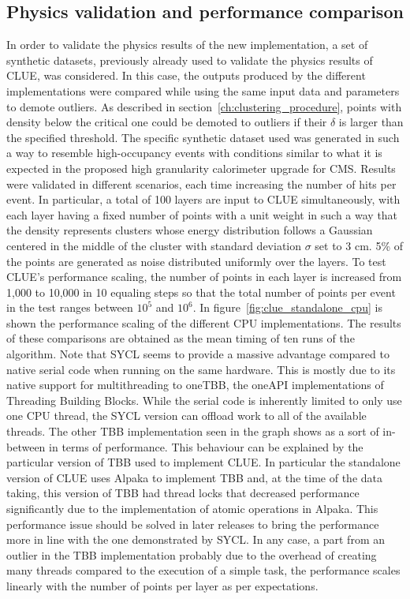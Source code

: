 \subsection{Physics validation and performance comparison}
In order to validate the physics results of the new implementation, a set of synthetic datasets, previously already used to validate the physics results of CLUE, was considered. In this case, the outputs produced by the different implementations were compared while using the same input data and parameters to demote outliers. As described in section~\ref{ch:clustering_procedure}, points with density below the critical one could be demoted to outliers if their $\delta$ is larger than the specified threshold. The specific synthetic dataset used was generated in such a way to resemble high-occupancy events with conditions similar to what it is expected in the proposed high granularity calorimeter upgrade for CMS. Results were validated in different scenarios, each time increasing the number of hits per event. In particular, a total of 100 layers are input to CLUE simultaneously, with each layer having a fixed number of points with a unit weight in such a way that the density represents clusters whose energy distribution follows a Gaussian centered in the middle of the cluster with standard deviation $\sigma$ set to 3 cm. 5\% of the points are generated as noise distributed uniformly over the layers. To test CLUE's performance scaling, the number of points in each layer is increased from 1,000 to 10,000 in 10 equaling steps so that the total number of points per event in the test ranges between $10^5$ and $10^6$. In figure~\ref{fig:clue_standalone_cpu} is shown the performance scaling of the different CPU implementations. The results of these comparisons are obtained as the mean timing of ten runs of the algorithm. Note that SYCL seems to provide a massive advantage compared to native serial code when running on the same hardware. This is mostly due to its native support for multithreading to oneTBB, the oneAPI implementations of Threading Building Blocks. While the serial code is inherently limited to only use one CPU thread, the SYCL version can offload work to all of the available threads. The other TBB implementation seen in the graph shows as a sort of in-between in terms of performance. This behaviour can be explained by the particular version of TBB used to implement CLUE. In particular the standalone version of CLUE uses Alpaka to implement TBB and, at the time of the data taking, this version of TBB had thread locks that decreased performance significantly due to the implementation of atomic operations in Alpaka. This performance issue should be solved in later releases to bring the performance more in line with the one demonstrated by SYCL. In any case, a part from an outlier in the TBB implementation probably due to the overhead of creating many threads compared to the execution of a simple task, the performance scales linearly with the number of points per layer as per expectations.

